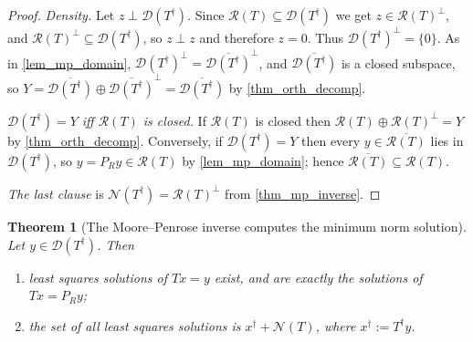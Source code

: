 \documentclass[a4paper]{report}
\theoremstyle{plain}
\newtheorem{theorem}{Theorem}[chapter]
\theoremstyle{definition}
\theoremstyle{remark}
\newcommand{\Ran}{\mathcal{R}}
\newcommand{\Ker}{\mathcal{N}}
\newcommand{\Dom}{\mathcal{D}}
\newcommand{\dg}{^{\dagger}}
\begin{document}
\begin{proof}
  \emph{Density.}  Let $z \perp \Dom(T\dg)$.  Since $\Ran(T) \subseteq \Dom(T\dg)$ we get
  $z \in \Ran(T)^{\perp}$, and $\Ran(T)^{\perp} \subseteq \Dom(T\dg)$, so $z \perp z$ and
  therefore $z = 0$.  Thus
  $\Dom(T\dg)^{\perp} = \{0\}$.  As in \cref{lem_mp_domain},
  $\Dom(T\dg)^{\perp} = \overline{\Dom(T\dg)}^{\perp}$, and $\overline{\Dom(T\dg)}$ is a
  closed subspace, so $Y = \overline{\Dom(T\dg)} \oplus \overline{\Dom(T\dg)}^{\perp}
  = \overline{\Dom(T\dg)}$ by \cref{thm_orth_decomp}.

  \emph{$\Dom(T\dg) = Y$ iff $\Ran(T)$ is closed.}  If $\Ran(T)$ is closed then
  $\Ran(T) \oplus \Ran(T)^{\perp} = Y$ by \cref{thm_orth_decomp}.  Conversely, if
  $\Dom(T\dg) = Y$ then every $y \in \overline{\Ran(T)}$ lies in $\Dom(T\dg)$, so
  $y = P_Ry \in \Ran(T)$ by \cref{lem_mp_domain}; hence
  $\overline{\Ran(T)} \subseteq \Ran(T)$.

  \emph{The last clause} is $\Ker(T\dg) = \Ran(T)^{\perp}$ from \cref{thm_mp_inverse}.
\end{proof}


\begin{theorem}[The Moore--Penrose inverse computes the minimum norm solution]
  \label{thm_mp_minnorm}
  Let $y \in \Dom(T\dg)$.  Then
  \begin{enumerate}
    \item least squares solutions of $Tx = y$ exist, and are exactly the solutions of
      $Tx = P_R y$;
    \item the set of all least squares solutions is $x\dg + \Ker(T)$, where
      $x\dg := T\dg y$.
  \end{enumerate}
\end{theorem}
\end{document}
